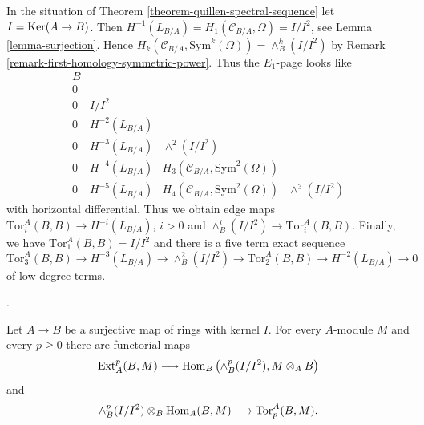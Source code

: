 \begin{remark}
\label{remark-elucidate-ss}
In the situation of Theorem \ref{theorem-quillen-spectral-sequence}
let $I = \mathop{\mathrm{Ker}}(A \to B)$. Then
$H^{-1}(L_{B/A}) = H_1(\mathcal{C}_{B/A}, \Omega) = I/I^2$, see
Lemma \ref{lemma-surjection}.
Hence $H_k(\mathcal{C}_{B/A}, \text{Sym}^k(\Omega)) = \wedge^k_B(I/I^2)$ by
Remark \ref{remark-first-homology-symmetric-power}. Thus the
$E_1$-page looks like
$$
\begin{matrix}
B \\
0 \\
0 & I/I^2 \\
0 & H^{-2}(L_{B/A}) \\
0 & H^{-3}(L_{B/A}) & \wedge^2(I/I^2) \\
0 & H^{-4}(L_{B/A}) & H_3(\mathcal{C}_{B/A}, \text{Sym}^2(\Omega)) \\
0 & H^{-5}(L_{B/A}) & H_4(\mathcal{C}_{B/A}, \text{Sym}^2(\Omega)) &
\wedge^3(I/I^2)
\end{matrix}
$$
with horizontal differential. Thus we obtain edge maps
$\text{Tor}_i^A(B, B) \to H^{-i}(L_{B/A})$, $i > 0$ and
$\wedge^i_B(I/I^2) \to \text{Tor}_i^A(B, B)$. Finally, we have
$\text{Tor}_1^A(B, B) = I/I^2$ and there is a
five term exact sequence
$$
\text{Tor}_3^A(B, B) \to H^{-3}(L_{B/A}) \to \wedge^2_B(I/I^2) \to
\text{Tor}_2^A(B, B) \to H^{-2}(L_{B/A}) \to 0
$$
of low degree terms.
\end{remark}

\begin{lemma}
\label{lemma-conormal-ext-tor-maps}
\begin{reference}
\cite[Expos\'e 149, Section 3, pp. 173--175]{FGA}.
\end{reference}
Let $A \to B$ be a surjective map of rings with kernel $I$. For every
$A$-module $M$ and every $p \geq 0$ there are functorial maps
$$
\mathop{\mathrm{Ext}}\nolimits_A^p(B, M) \longrightarrow
\mathop{\mathrm{Hom}}\nolimits_B\left(\wedge_B^p(I/I^2), M \otimes_A B\right)
$$
and
$$
\wedge_B^p(I/I^2) \otimes_B \mathop{\mathrm{Hom}}\nolimits_A(B, M)
\longrightarrow \text{Tor}_p^A(B, M).
$$
\end{lemma}

